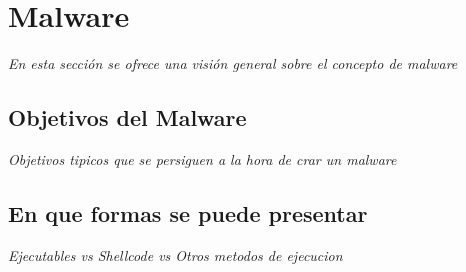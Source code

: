 \chapter{Malware}

\textit{En esta sección se ofrece una visión general sobre el concepto de malware}
\vspace{1em}

\section{Objetivos del Malware}

\textit{Objetivos tipicos que se persiguen a la hora de crar un malware}
\vspace{1em}

\section{En que formas se puede presentar}

\textit{Ejecutables vs Shellcode vs Otros metodos de ejecucion}
\vspace{1em}


